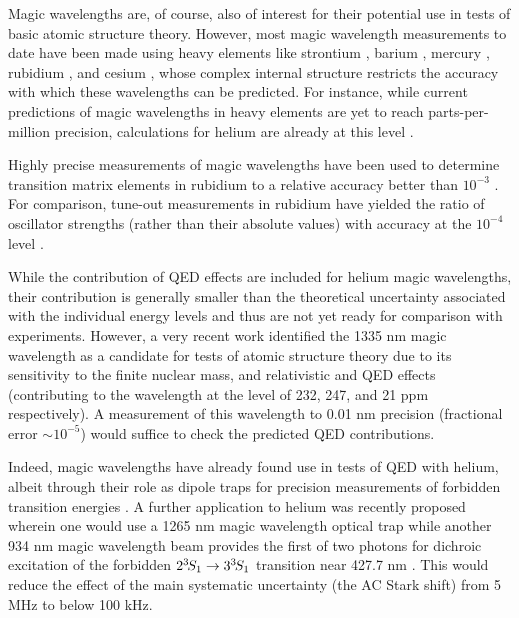 	Magic wavelengths are, of course, also of interest for their potential use in tests of basic atomic structure theory.
	However, most magic wavelength measurements to date have been made using heavy elements like strontium \cite{BilickiThesis}, barium \cite{Chanu20}, mercury \cite{Yi11}, rubidium \cite{Herold12}, and cesium \cite{Yoon19}, whose complex internal structure restricts the accuracy with which these wavelengths can be predicted.
	For instance, while current predictions of magic wavelengths in heavy elements are yet to reach parts-per-million precision, calculations for helium are already at this level \cite{Wu18,Zhang21_magic}.
	
	Highly precise measurements of magic wavelengths have been used to determine transition matrix elements in rubidium to a relative accuracy better than $10^{-3}$ \cite{Herold12}.
	For comparison, tune-out measurements in rubidium have yielded the ratio of oscillator strengths (rather than their absolute values) with accuracy at the $10^{-4}$ level \cite{Leonard15}.
	
	While the contribution of QED effects are included for helium magic wavelengths, their contribution is generally smaller than the theoretical uncertainty associated with the individual energy levels and thus are not yet ready for comparison with experiments.
	However, a very recent work identified the 1335 nm magic wavelength as a candidate for tests of atomic structure theory due to its sensitivity to the finite nuclear mass, and relativistic and QED effects \cite{Zhang21_magic} (contributing to the wavelength at the level of 232, 247, and 21 ppm respectively).
	A measurement of this wavelength to 0.01 nm precision (fractional error $\sim10^{-5}$) would suffice to check the predicted QED contributions.
	
	Indeed, magic wavelengths have already found use in tests of QED with helium, albeit through their role as dipole traps for precision measurements of forbidden transition energies \cite{Rengelink18}.
	A further application to helium was recently proposed wherein one would use a 1265 nm magic wavelength optical trap while another 934 nm magic wavelength beam provides the first of two photons for dichroic excitation of the forbidden $2^{3\!} S_1\rightarrow 3^{3\!} S_1$ transition near 427.7 nm \cite{Thomas20, Zhang21_forbidden}.
	This would reduce the effect of the main systematic uncertainty (the AC Stark shift) from 5 MHz to below 100 kHz.



